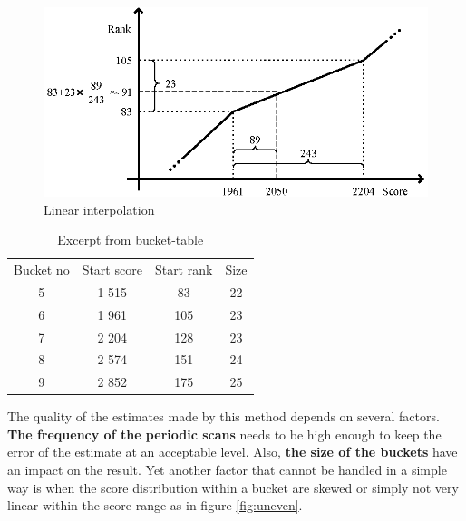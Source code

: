 \begin{figure}[h!]
  \centering
  \caption{Linear interpolation}
  \label{fig:linear}
  \includegraphics[width=13cm]{img/linear_interpolation.eps}
\end{figure}

\begin{table}[h]
  \begin{center}
  \begin{tabular}{ c c c c }
    Bucket no & Start score & Start rank & Size \\
    5 & 1 515 & 83 & 22 \\ 
    6 & 1 961 & 105 & 23 \\ 
    7 & 2 204 & 128 & 23 \\ 
    8 & 2 574 & 151 & 24 \\  
    9 & 2 852 & 175 & 25 \\ 
  \end{tabular} 
  \caption{Excerpt from bucket-table}
  \label{table:ranking-table}
  \end{center} 
\end{table}

The quality of the estimates made by this method depends on several factors.
\textbf{The frequency of the periodic scans} needs to be high enough to keep the error of the estimate at an acceptable level. Also, \textbf{the size of the buckets} have an impact on the result. Yet another factor that cannot be handled in a simple way is when the score distribution within a bucket are skewed or simply not very linear within the score range as in figure \ref{fig:uneven}.

